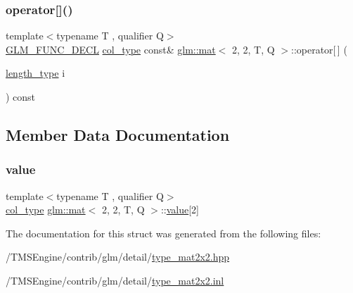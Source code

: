 \mbox{\label{structglm_1_1mat_3_012_00_012_00_01_t_00_01_q_01_4_a06ff5b61af6353d73db79acd46534b0c}} 
\subsubsection{\texorpdfstring{operator[]()}{operator[]()}\hspace{0.1cm}{\footnotesize\ttfamily [2/2]}}
{\footnotesize\ttfamily template$<$typename T , qualifier Q$>$ \\
\hyperlink{setup_8hpp_ab2d052de21a70539923e9bcbf6e83a51}{G\+L\+M\+\_\+\+F\+U\+N\+C\+\_\+\+D\+E\+CL} \hyperlink{structglm_1_1mat_3_012_00_012_00_01_t_00_01_q_01_4_a2983591534ee443dd378cedcbe771749}{col\+\_\+type} const\& \hyperlink{structglm_1_1mat}{glm\+::mat}$<$ 2, 2, T, Q $>$\+::operator\mbox{[}$\,$\mbox{]} (\begin{DoxyParamCaption}\item[{\hyperlink{structglm_1_1mat_3_012_00_012_00_01_t_00_01_q_01_4_a96c65b091fc8fe8e6f5637e30c9c1f81}{length\+\_\+type}}]{i }\end{DoxyParamCaption}) const}



\subsection{Member Data Documentation}
\mbox{\label{structglm_1_1mat_3_012_00_012_00_01_t_00_01_q_01_4_a68d5d8eb032c2089e37ffe09c786da80}} 
\subsubsection{\texorpdfstring{value}{value}}
{\footnotesize\ttfamily template$<$typename T , qualifier Q$>$ \\
\hyperlink{structglm_1_1mat_3_012_00_012_00_01_t_00_01_q_01_4_a2983591534ee443dd378cedcbe771749}{col\+\_\+type} \hyperlink{structglm_1_1mat}{glm\+::mat}$<$ 2, 2, T, Q $>$\+::\hyperlink{_s_d_l__opengl__glext_8h_a8ad81492d410ff2ac11f754f4042150f}{value}\mbox{[}2\mbox{]}\hspace{0.3cm}{\ttfamily [private]}}



The documentation for this struct was generated from the following files\+:\begin{DoxyCompactItemize}
\item 
/\+T\+M\+S\+Engine/contrib/glm/detail/\hyperlink{type__mat2x2_8hpp}{type\+\_\+mat2x2.\+hpp}\item 
/\+T\+M\+S\+Engine/contrib/glm/detail/\hyperlink{type__mat2x2_8inl}{type\+\_\+mat2x2.\+inl}\end{DoxyCompactItemize}

